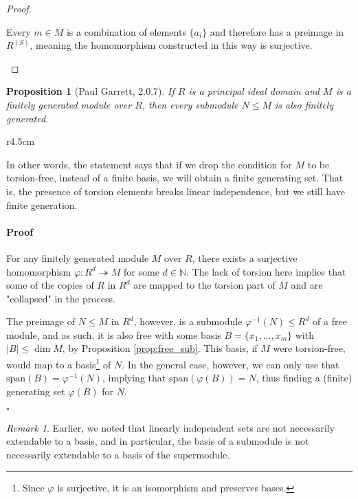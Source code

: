 \documentclass{article}
\newif\ifusemulticols
\theoremstyle{definition}
\theoremstyle{remark}
\newtheorem*{note}{Remark}
\theoremstyle{plain}
\theoremstyle{plain}
\newtheorem{prop}[theorem]{Proposition}
\newenvironment{mymulticols}
    { \ifusemulticols \begin{multicols}{2} \fi }
    { \ifusemulticols \end{multicols} \fi }
\newenvironment{myproof}{\paragraph{Proof}}{\hfill$\square$}
\newcommand{\N}{\mathbb{N}}
\begin{document}
\begin{mymulticols}
\begin{proof}
\begin{itemize}
            Every $m \in M$ is a combination of elements $\{a_i\}$ and therefore has a preimage in
            $R^{(S)}$, meaning the homomorphism constructed in this way is surjective.
    \end{itemize}

\end{proof}

\begin{prop}[Paul Garrett, 2.0.7]
    \label{prop:finitely_generated_rank}
    If $R$ is a principal ideal domain and $M$ is a finitely generated module over $R$, then every
    submodule $N \le M$ is also finitely generated.
\end{prop}

\begin{wrapfigure}[13]{r}{4.5cm}
\end{wrapfigure}

In other words, the statement says that if we drop the condition for $M$ to be torsion-free, instead
of a finite basis, we will obtain a finite generating set. 
That is, the presence of torsion elements breaks linear independence, but we still have finite
generation.

\begin{myproof}
    For any finitely generated module $M$ over $R$, there exists a surjective homomorphism $\varphi
    : R^d \twoheadrightarrow M$ for some $d \in \N$. The lack of torsion here implies that some of
    the copies of $R$ in $R^d$ are mapped to the torsion part of $M$ and are "collapsed" in the process.

    The preimage of $N \le M$ in $R^d$, however, is a submodule $\varphi^{-1}(N) \le R^d$ of a free
    module, and as such, it is also free with some basis $B = \{x_1, \ldots, x_m\}$ with $|B| \leq
    \dim M$, by Proposition \ref{prop:free_sub}.
    This basis, if $M$ were torsion-free, would map to a basis\footnote{Since $\varphi$ is
    surjective, it is an isomorphism and preserves bases.} of $N$.
    In the general case, however, we can only use that $\text{span}(B) = \varphi^{-1}(N)$, implying
    that $\text{span}(\varphi(B)) = N$, thus finding a (finite) generating set $\varphi(B)$ for $N$.

\end{myproof}

\begin{note}
    Earlier, we noted that linearly independent sets are not necessarily extendable to a basis, and
    in particular, the basis of a submodule is not necessarily extendable to a basis of the supermodule.


\end{note}
\end{mymulticols}
\end{document}

